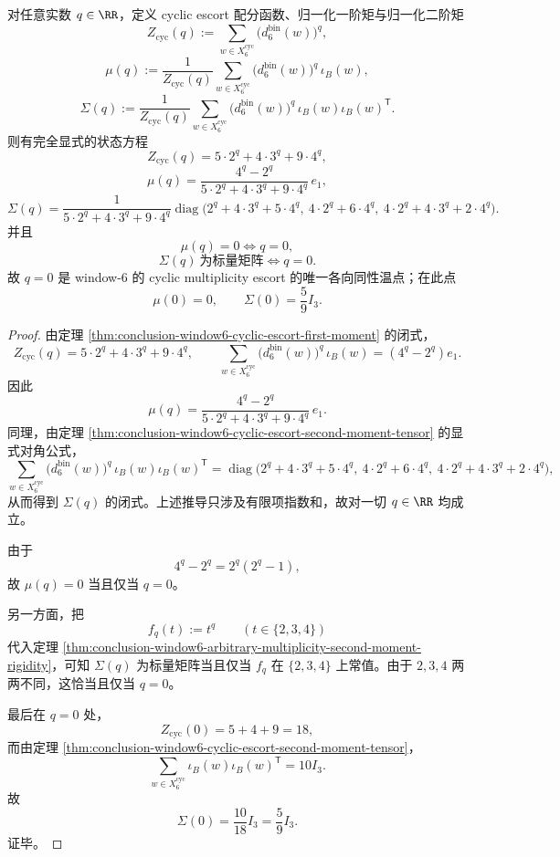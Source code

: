 \begin{theorem}\label{thm:conclusion-window6-cyclic-multiplicity-escort-unique-isotropy}
对任意实数 \(q\in\RR\)，定义 cyclic escort 配分函数、归一化一阶矩与归一化二阶矩
\[
Z_{\mathrm{cyc}}(q)
:=
\sum_{w\in X_6^{\mathrm{cyc}}}\bigl(d_6^{\mathrm{bin}}(w)\bigr)^q,
\]
\[
\mu(q)
:=
\frac{1}{Z_{\mathrm{cyc}}(q)}
\sum_{w\in X_6^{\mathrm{cyc}}}\bigl(d_6^{\mathrm{bin}}(w)\bigr)^q\,\iota_B(w),
\]
\[
\Sigma(q)
:=
\frac{1}{Z_{\mathrm{cyc}}(q)}
\sum_{w\in X_6^{\mathrm{cyc}}}\bigl(d_6^{\mathrm{bin}}(w)\bigr)^q\,
\iota_B(w)\iota_B(w)^{\mathsf T}.
\]
则有完全显式的状态方程
\[
Z_{\mathrm{cyc}}(q)=5\cdot 2^q+4\cdot 3^q+9\cdot 4^q,
\]
\[
\mu(q)
=
\frac{4^q-2^q}{5\cdot 2^q+4\cdot 3^q+9\cdot 4^q}\,e_1,
\]
\[
\Sigma(q)
=
\frac{1}{5\cdot 2^q+4\cdot 3^q+9\cdot 4^q}
\operatorname{diag}\!\bigl(
2^q+4\cdot 3^q+5\cdot 4^q,\
4\cdot 2^q+6\cdot 4^q,\
4\cdot 2^q+4\cdot 3^q+2\cdot 4^q
\bigr).
\]
并且
\[
\mu(q)=0 \iff q=0,
\]
\[
\Sigma(q)\ \text{为标量矩阵} \iff q=0.
\]
故 \(q=0\) 是 window-\(6\) 的 cyclic multiplicity escort 的唯一各向同性温点；在此点
\[
\mu(0)=0,
\qquad
\Sigma(0)=\frac{5}{9}I_3.
\]
\end{theorem}

\begin{proof}
由定理 \ref{thm:conclusion-window6-cyclic-escort-first-moment} 的闭式，
\[
Z_{\mathrm{cyc}}(q)=5\cdot 2^q+4\cdot 3^q+9\cdot 4^q,
\qquad
\sum_{w\in X_6^{\mathrm{cyc}}}\bigl(d_6^{\mathrm{bin}}(w)\bigr)^q\,\iota_B(w)
=(4^q-2^q)e_1.
\]
因此
\[
\mu(q)
=
\frac{4^q-2^q}{5\cdot 2^q+4\cdot 3^q+9\cdot 4^q}\,e_1.
\]
同理，由定理 \ref{thm:conclusion-window6-cyclic-escort-second-moment-tensor} 的显式对角公式，
\[
\sum_{w\in X_6^{\mathrm{cyc}}}\bigl(d_6^{\mathrm{bin}}(w)\bigr)^q\,
\iota_B(w)\iota_B(w)^{\mathsf T}
=
\operatorname{diag}\!\bigl(
2^q+4\cdot 3^q+5\cdot 4^q,\
4\cdot 2^q+6\cdot 4^q,\
4\cdot 2^q+4\cdot 3^q+2\cdot 4^q
\bigr),
\]
从而得到 \(\Sigma(q)\) 的闭式。上述推导只涉及有限项指数和，故对一切 \(q\in\RR\) 均成立。

由于
\[
4^q-2^q=2^q(2^q-1),
\]
故 \(\mu(q)=0\) 当且仅当 \(q=0\)。

另一方面，把
\[
f_q(t):=t^q\qquad (t\in\{2,3,4\})
\]
代入定理 \ref{thm:conclusion-window6-arbitrary-multiplicity-second-moment-rigidity}，可知 \(\Sigma(q)\) 为标量矩阵当且仅当 \(f_q\) 在 \(\{2,3,4\}\) 上常值。由于 \(2,3,4\) 两两不同，这恰当且仅当 \(q=0\)。

最后在 \(q=0\) 处，
\[
Z_{\mathrm{cyc}}(0)=5+4+9=18,
\]
而由定理 \ref{thm:conclusion-window6-cyclic-escort-second-moment-tensor}，
\[
\sum_{w\in X_6^{\mathrm{cyc}}}\iota_B(w)\iota_B(w)^{\mathsf T}=10I_3.
\]
故
\[
\Sigma(0)=\frac{10}{18}I_3=\frac59 I_3.
\]
证毕。
\end{proof}

